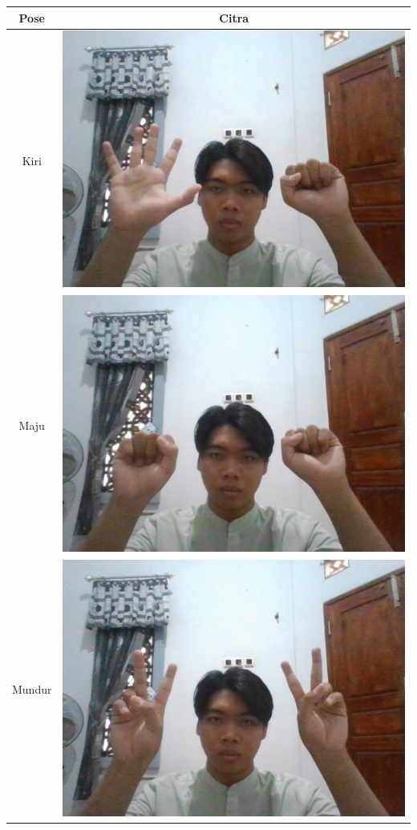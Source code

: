 \begin{table}[H]
  \centering
  \begin{tabular}{|c|c|}
    \hline
    Pose   & Citra \\ \hline
    Kiri   & \includegraphics[width=0.4\linewidth]{../Gambar/posekiri.png} \\ \hline
    Maju   & \includegraphics[width=0.4\linewidth]{../Gambar/posemaju.png} \\ \hline
    Mundur & \includegraphics[width=0.4\linewidth]{../Gambar/posemundur.png} \\ \hline
  \end{tabular}
\end{table}

